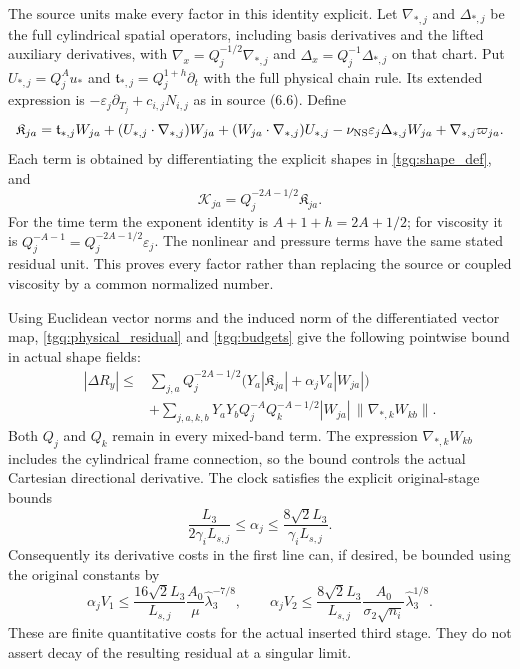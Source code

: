 \documentclass[11pt]{article}
\begin{document}
The source units make every factor in this identity explicit.
Let $\nabla_{*,j}$ and $\Delta_{*,j}$ be the full cylindrical spatial
operators, including basis derivatives and the lifted auxiliary
derivatives, with
$\nabla_x=Q_j^{-1/2}\nabla_{*,j}$ and
$\Delta_x=Q_j^{-1}\Delta_{*,j}$ on that chart.
Put $U_{*,j}=Q_j^Au_*$ and
$\mathfrak t_{*,j}=Q_j^{1+h}\partial_t$ with the full physical
chain rule. Its extended expression is
$-\varepsilon_j\partial_{T_j}+c_{i,j}N_{i,j}$ as in source (6.6).
Define
\[
 \mathfrak K_{ja}=
 \mathfrak t_{*,j}W_{ja}
 +(U_{*,j}\cdot\nabla_{*,j})W_{ja}
 +(W_{ja}\cdot\nabla_{*,j})U_{*,j}
 -\nu_{\rm NS}\varepsilon_j\Delta_{*,j}W_{ja}
 +\nabla_{*,j}\varpi_{ja}.
\]
Each term is obtained by differentiating the explicit shapes in
\eqref{tgq:shape_def}, and
\[
 \mathcal K_{ja}=Q_j^{-2A-1/2}\mathfrak K_{ja}.
\]
For the time term the exponent identity is $A+1+h=2A+1/2$;
for viscosity it is
$Q_j^{-A-1}=Q_j^{-2A-1/2}\varepsilon_j$.
The nonlinear and pressure terms have the same stated residual unit.
This proves every factor rather than replacing the source or coupled
viscosity by a common normalized number.

Using Euclidean vector norms and the induced norm of the differentiated
vector map, \eqref{tgq:physical_residual} and
\eqref{tgq:budgets} give the following pointwise bound in actual
shape fields:
\begin{equation}
 \begin{split}
 |\Delta R_y|\le{}&
 \sum_{j,a}Q_j^{-2A-1/2}
       \bigl(Y_a|\mathfrak K_{ja}|+\alpha_jV_a|W_{ja}|\bigr)\\
 &+\sum_{j,a,k,b}Y_aY_bQ_j^{-A}Q_k^{-A-1/2}
                   |W_{ja}|\,\|\nabla_{*,k}W_{kb}\|.
 \end{split}\label{tgq:residual_bound}
\end{equation}
Both $Q_j$ and $Q_k$ remain in every mixed-band term.
The expression $\nabla_{*,k}W_{kb}$ includes the cylindrical frame
connection, so the bound controls the actual Cartesian directional
derivative. The clock satisfies the explicit original-stage bounds
\[
 \frac{L_3}{2\gamma_iL_{s,j}}\le\alpha_j
       \le\frac{8\sqrt2L_3}{\gamma_iL_{s,j}}.
\]
Consequently its derivative costs in the first line can, if desired,
be bounded using the original constants by
\[
 \alpha_jV_1\le
  \frac{16\sqrt2L_3}{L_{s,j}}
       \frac{A_0}{\mu}\widehat\lambda_3^{-7/8},\qquad
 \alpha_jV_2\le
  \frac{8\sqrt2L_3}{L_{s,j}}
       \frac{A_0}{\sigma_2\sqrt{n_i}}\widehat\lambda_3^{1/8}.
\]
These are finite quantitative costs for the actual inserted third stage.
They do not assert decay of the resulting residual at a singular limit.
\end{document}
